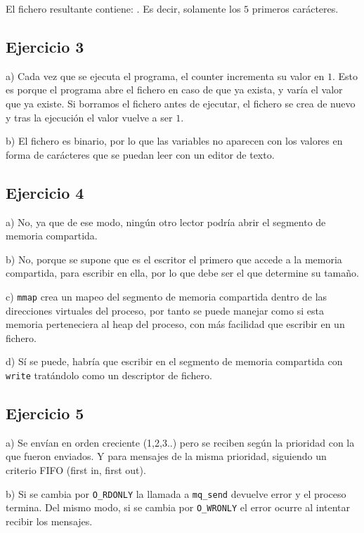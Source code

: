 \documentclass{article}
\begin{document}
El fichero resultante contiene: . Es decir, solamente los $5$ primeros carácteres.


\subsection*{Ejercicio 3}

a) Cada vez que se ejecuta el programa, el counter incrementa su valor en $1$. Esto es porque el programa abre el fichero en caso de que ya exista, y varía el valor que ya existe. Si borramos el fichero antes de ejecutar, el fichero se crea de nuevo y tras la ejecución el valor vuelve a ser $1$.

b) El fichero es binario, por lo que las variables no aparecen con los valores en forma de carácteres que se puedan leer con un editor de texto.


\subsection*{Ejercicio 4}

a) No, ya que de ese modo, ningún otro lector podría abrir el segmento de memoria compartida.

b) No, porque se supone que es el escritor el primero que accede a la memoria compartida, para escribir en ella, por lo que debe ser el que determine su tamaño.

c) \texttt{mmap} crea un mapeo del segmento de memoria compartida dentro de las direcciones virtuales del proceso, por tanto se puede manejar como si esta memoria perteneciera al heap del proceso, con más facilidad que escribir en un fichero.

d) Sí se puede, habría que escribir en el segmento de memoria compartida con \texttt{write} tratándolo como un descriptor de fichero.

\subsection*{Ejercicio 5}

a) Se envían en orden creciente (1,2,3..) pero se reciben según la prioridad con la que fueron enviados. Y para mensajes de la misma prioridad, siguiendo un criterio FIFO (first in, first out).

b) Si se cambia por \texttt{O\_RDONLY} la llamada a \texttt{mq\_send} devuelve error y el proceso termina. Del mismo modo, si se cambia por \texttt{O\_WRONLY} el error ocurre al intentar recibir los mensajes.
\end{document}
